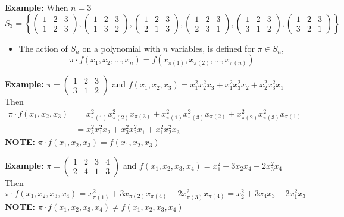 \documentclass[12pt]{memoir}
\begin{document}
\textbf{Example:} When $n = 3$
\[
S_3 = \left\{ 
\begin{pmatrix} 1 & 2 & 3 \\ 1 & 2 & 3 \end{pmatrix}, 
\begin{pmatrix} 1 & 2 & 3 \\ 1 & 3 & 2 \end{pmatrix}, 
\begin{pmatrix} 1 & 2 & 3 \\ 2 & 1 & 3 \end{pmatrix}, 
\begin{pmatrix} 1 & 2 & 3 \\ 2 & 3 & 1 \end{pmatrix}, 
\begin{pmatrix} 1 & 2 & 3 \\ 3 & 1 & 2 \end{pmatrix}, 
\begin{pmatrix} 1 & 2 & 3 \\ 3 & 2 & 1 \end{pmatrix} 
\right\}
\]

\begin{itemize}[label=$\diamond$]
    \item The action of $S_n$ on a polynomial with $n$ variables, is defined for $\pi \in S_n$,
    \[
    \pi \cdot f(x_1, x_2, \dots, x_n) = f(x_{\pi(1)}, x_{\pi(2)}, \dots, x_{\pi(n)})
    \]
\end{itemize}

\textbf{Example:} $\pi = \begin{pmatrix} 1 & 2 & 3 \\ 3 & 1 & 2 \end{pmatrix}$ and $f(x_1, x_2, x_3) = x_1^2 x_2^2 x_3 + x_1^2 x_3^2 x_2 + x_2^2 x_3^2 x_1$\\
Then
\[
\begin{aligned}
\pi \cdot f(x_1, x_2, x_3) &= x_{\pi(1)}^2 x_{\pi(2)}^2 x_{\pi(3)} + x_{\pi(1)}^2 x_{\pi(3)}^2 x_{\pi(2)} + x_{\pi(2)}^2 x_{\pi(3)}^2 x_{\pi(1)}\\ 
&= x_3^2 x_1^2 x_2 + x_3^2 x_2^2 x_1 + x_1^2 x_2^2 x_3
\end{aligned}
\]
\textbf{NOTE:} $\pi \cdot f(x_1, x_2, x_3) = f(x_1, x_2, x_3)$

\textbf{Example:} $\pi = \begin{pmatrix} 1 & 2 & 3 & 4 \\ 2 & 4 & 1 & 3 \end{pmatrix}$ and $f(x_1, x_2, x_3, x_4) = x_1^2 + 3x_2 x_4 - 2x_3^2 x_4$\\
Then
\[
\pi \cdot f(x_1, x_2, x_3, x_4) = x_{\pi(1)}^2 + 3x_{\pi(2)} x_{\pi(4)} - 2x_{\pi(3)}^2 x_{\pi(4)} = x_2^2 + 3x_4 x_3 - 2x_1^2 x_3
\]
\textbf{NOTE:} $\pi \cdot f(x_1, x_2, x_3, x_4) \neq f(x_1, x_2, x_3, x_4)$
\end{document}
